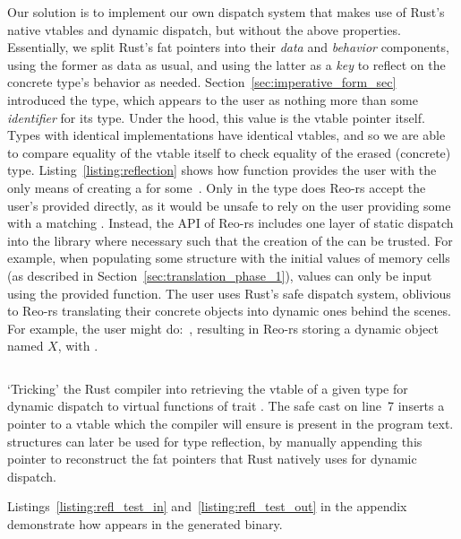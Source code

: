 Our solution is to implement our own dispatch system that makes use of Rust's native vtables and dynamic dispatch, but without the above properties. Essentially, we split Rust's fat pointers into their \textit{data} and \textit{behavior} components, using the former as data as usual, and using the latter as a \textit{key} to reflect on the concrete type's behavior as needed. Section~\ref{sec:imperative_form_sec} introduced the  type, which appears to the user as nothing more than some \textit{identifier} for its type. Under the hood, this value is the vtable pointer itself. Types with identical implementations have identical vtables, and so we are able to compare equality of the vtable itself to check equality of the erased (concrete) type. Listing~\ref{listing:reflection} shows how function  provides the user with the only means of creating a  for some~. Only in the  type does Reo-rs accept the user's provided  directly, as it would be unsafe to rely on the user providing some  with a matching . Instead, the API of Reo-rs includes one layer of static dispatch into the library where necessary such that the creation of the  can be trusted. For example, when populating some  structure with the initial values of memory cells (as described in Section~\ref{sec:translation_phase_1}), values can only be input using the provided  function. The user uses Rust's safe dispatch system, oblivious to Reo-rs translating their concrete objects into dynamic ones behind the scenes. For example, the user might do:~, resulting in Reo-rs storing a dynamic  object named $X$, with .

\begin{listing}[ht]
	\centering
	\inputminted{rust}{reflection.rs}
	\caption[Tricking Rust into exposing a vtable.]{`Tricking' the Rust compiler into retrieving the vtable of a given type  for dynamic dispatch to virtual functions of trait . The safe cast on line~7 inserts a pointer to a vtable which the compiler will ensure is present in the program text.  structures can later be used for type reflection, by manually appending this pointer to reconstruct the fat pointers that Rust natively uses for dynamic dispatch.}
	\label{listing:reflection}
\end{listing}

Listings~\ref{listing:refl_test_in} and~\ref{listing:refl_test_out} in the appendix demonstrate how  appears in the generated binary.

